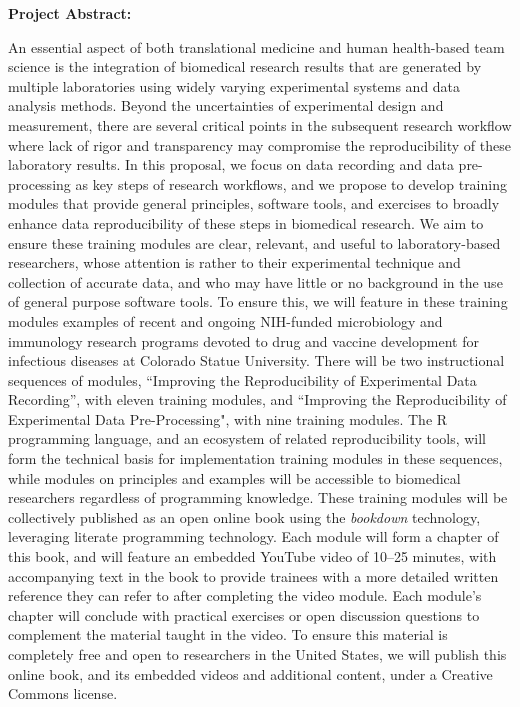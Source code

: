 \documentclass[pdftex,english,11.5pt,parskip=half]{scrartcl}
\begin{document}
\def\bf{\normalfont\bfseries}
\pagestyle{empty}

{\large \textbf{Project Abstract:}}


An essential aspect of both translational medicine and human 
health-based team science is the integration of biomedical research 
results that are generated by multiple laboratories using widely varying 
experimental systems and data analysis methods. Beyond the uncertainties of 
experimental design and measurement, there are several critical points in 
the subsequent research workflow where lack of rigor and transparency 
may compromise the reproducibility of these laboratory results.  In this proposal, 
we focus on data recording and data pre-processing as key steps 
of research workflows, and we propose to develop training modules that 
provide general principles, software tools, and exercises to broadly 
enhance data reproducibility of these steps in biomedical research. We aim to
ensure these training modules are clear, relevant, and useful to laboratory-based 
researchers, whose attention is rather to their experimental technique and collection 
of accurate data, and who may have little or no background in the use of general 
purpose software tools.  To ensure this, we will feature in these training modules 
examples of recent and ongoing NIH-funded microbiology and immunology research 
programs devoted to drug and vaccine development for infectious diseases at 
Colorado Statue University. 
There will be two instructional sequences of modules, ``Improving the Reproducibility of Experimental Data Recording'', with eleven training modules, 
and ``Improving the Reproducibility of Experimental Data Pre-Processing", with nine training modules.
The R programming language, and an ecosystem of
related reproducibility tools, will form the technical basis for implementation
training modules in these sequences, while modules on principles and examples will be accessible to biomedical researchers regardless of programming knowledge.  
These training modules will be collectively
published as an open online book using the \textit{bookdown} technology, leveraging literate programming technology. Each
module will form a chapter of this book, and will feature an embedded YouTube
video of 10--25 minutes, with accompanying text in the book to provide trainees
with a more detailed written reference they can refer to after completing the
video module.  Each module's chapter will conclude with practical exercises or
open discussion questions to complement the material taught in the video. 
To
ensure this material is completely free and open to researchers in the United
States, we will publish this online book, and its embedded videos and additional content, under a Creative Commons
license.
\end{document}
